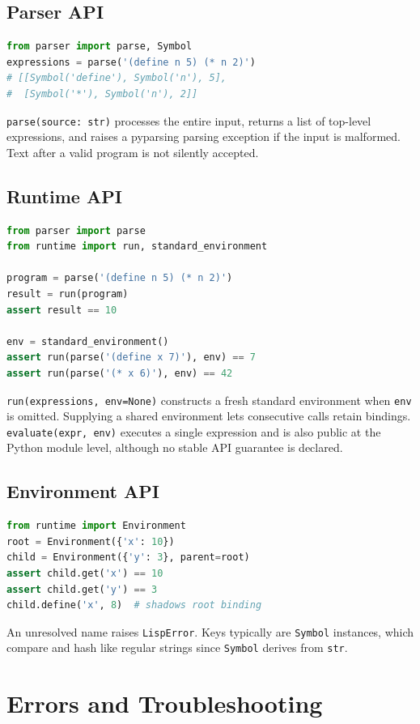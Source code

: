 \documentclass[11pt,a4paper,oneside]{report}
\begin{document}
\section{Parser API}
\begin{lstlisting}[language=Python]
from parser import parse, Symbol
expressions = parse('(define n 5) (* n 2)')
# [[Symbol('define'), Symbol('n'), 5],
#  [Symbol('*'), Symbol('n'), 2]]
\end{lstlisting}
\texttt{parse(source: str)} processes the entire input, returns a list of top-level expressions, and raises a pyparsing parsing exception if the input is malformed. Text after a valid program is not silently accepted.
\section{Runtime API}
\begin{lstlisting}[language=Python]
from parser import parse
from runtime import run, standard_environment

program = parse('(define n 5) (* n 2)')
result = run(program)
assert result == 10

env = standard_environment()
assert run(parse('(define x 7)'), env) == 7
assert run(parse('(* x 6)'), env) == 42
\end{lstlisting}
\texttt{run(expressions, env=None)} constructs a fresh standard environment when \texttt{env} is omitted. Supplying a shared environment lets consecutive calls retain bindings. \texttt{evaluate(expr, env)} executes a single expression and is also public at the Python module level, although no stable API guarantee is declared.
\section{Environment API}
\begin{lstlisting}[language=Python]
from runtime import Environment
root = Environment({'x': 10})
child = Environment({'y': 3}, parent=root)
assert child.get('x') == 10
assert child.get('y') == 3
child.define('x', 8)  # shadows root binding
\end{lstlisting}
An unresolved name raises \texttt{LispError}. Keys typically are \texttt{Symbol} instances, which compare and hash like regular strings since \texttt{Symbol} derives from \texttt{str}.

\chapter{Errors and Troubleshooting}
\end{document}
